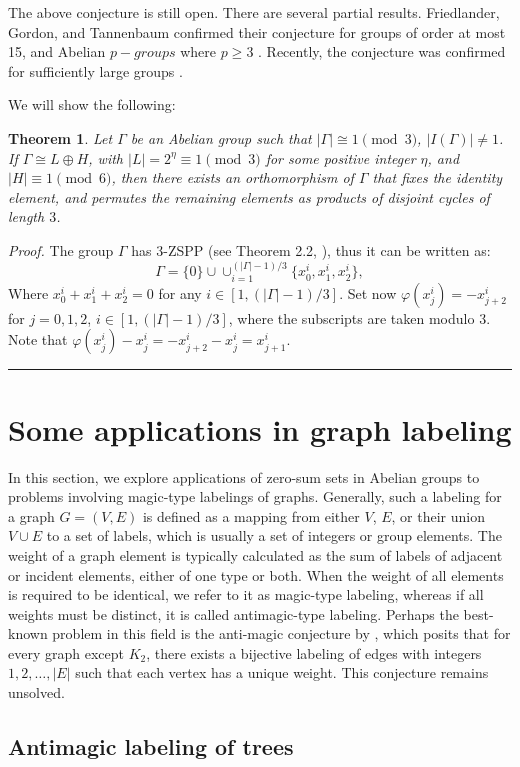 \documentclass{article}
\newcommand{\qed}{\hfill \rule{.1in}{.1in}}
\newtheorem{thm}{Theorem}[section]
\begin{document}
The above conjecture is still open. There are several partial results. Friedlander,
Gordon, and Tannenbaum confirmed their conjecture for groups of order at most 15, and Abelian $p-groups$ where $p \geq 3$ \cite{FrieGorTan}. Recently, the conjecture was confirmed for sufficiently large groups \cite{Muyesser}.

We will show the following:
\begin{thm}
Let $\Gamma$ be an Abelian group such that $|\Gamma|\cong 1\pmod{3}$, $|I(\Gamma)|\neq 1$. 
If $\Gamma\cong L\oplus H$, with $|L|=2^{\eta}\equiv 1\pmod 3$ for some positive integer $\eta$, and $|H|\equiv 1\pmod 6$, then there exists an orthomorphism of $\Gamma$ that fixes the identity element, and permutes the remaining elements as products of disjoint cycles of length $3$. 
\end{thm}
\textit{Proof.}  The group $\Gamma$ has $3$-ZSPP (see Theorem 2.2, \cite{CicrSuch2}), thus it can be written as:
$$\Gamma=\{0\}\cup\cup_{i=1}^{(|\Gamma|-1)/3}\{x_0^i,x_1^i,x_2^i\},$$
Where $x_0^i+x_1^i+x_2^i=0$ for any $i\in[1,(|\Gamma|-1)/3].$ Set now $\varphi(x_j^i)=-x_{j+2}^i$ for $j=0,1,2$, $i\in[1,(|\Gamma|-1)/3]$, where the subscripts are taken modulo $3$. Note that $\varphi(x_j^i)-x_j^i=-x_{j+2}^i-x_{j}^i=x_{j+1}^i$.~\qed





\section{Some applications in graph labeling}\label{sec:sa}
In this section, we explore applications of zero-sum sets in Abelian groups to problems involving magic-type labelings of graphs. Generally, such a labeling for a graph $G=(V,E)$ is defined as a mapping from either 
$V$, $E$, or their union $V\cup E$ to a set of labels, which is usually a set of integers or group elements. The weight of a graph element is typically calculated as the sum of labels of adjacent or incident elements, either of one type or both. When the weight of all elements is required to be identical, we refer to it as magic-type labeling, whereas if all weights must be distinct, it is called antimagic-type labeling. Perhaps the best-known problem in this field is the anti-magic conjecture by \cite{HR}, which posits that for every graph except 
$K_2$, there exists a bijective labeling of edges with integers $1, 2, \ldots, |E|$ such that each vertex has a unique weight. This conjecture remains unsolved.
\subsection{Antimagic labeling of trees}
\end{document}
